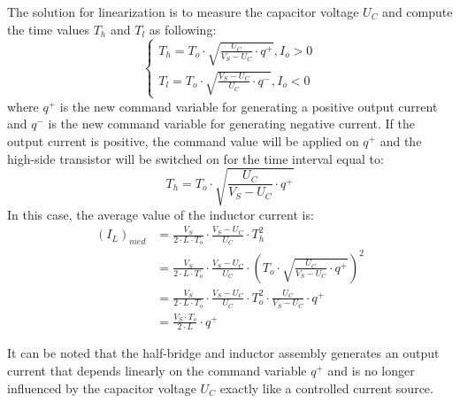 The solution for linearization is to measure the capacitor voltage $U_C$ and compute the time values $T_h$ and $T_l$ as following:
\begin{equation}
    \left\{
        \begin{aligned}
            \label{eq:timecalc}
            T_h = T_o \cdot \sqrt{\frac{U_C}{V_S - U_C} \cdot q^+},   I_o > 0 \\
            T_l = T_o \cdot \sqrt{\frac{V_S - U_C}{U_C} \cdot q^-},   I_o < 0
        \end{aligned}
    \right.
\end{equation}
where $q^+$ is the new command variable for generating a positive output current and $q^-$ is the new command variable for generating negative current.
If the output current is positive, the command value will be applied on $q^+$ and the high-side transistor will be switched on for the time interval equal to:
\begin{equation}
    T_h = T_o \cdot \sqrt{\frac{U_C}{V_S - U_C} \cdot q^+}
\end{equation}
In this case, the average value of the inductor current is:
\begin{equation}
    \begin{split}
        (I_L)_{med} &= \frac{V_S}{2 \cdot L \cdot T_o} \cdot \frac{V_S - U_C}{U_C} \cdot T_h^2 \\
        &= \frac{V_S}{2 \cdot L \cdot T_o} \cdot \frac{V_S - U_C}{U_C} \cdot \left(T_o \cdot \sqrt{\frac{U_C}{V_S - U_C} \cdot q^+}\right)^2 \\
        &= \frac{V_S}{2 \cdot L \cdot T_o} \cdot \frac{V_S - U_C}{U_C} \cdot T_o^2 \cdot \frac{U_C}{V_S - U_C} \cdot q^+ \\
        &= \frac{V_S \cdot T_o}{2 \cdot L} \cdot q^+
    \end{split}
\end{equation}

It can be noted that the half-bridge and inductor assembly generates an output current that depends linearly on the command variable $q^+$ and is no longer influenced by the capacitor voltage $U_C$ exactly like a controlled current source.

